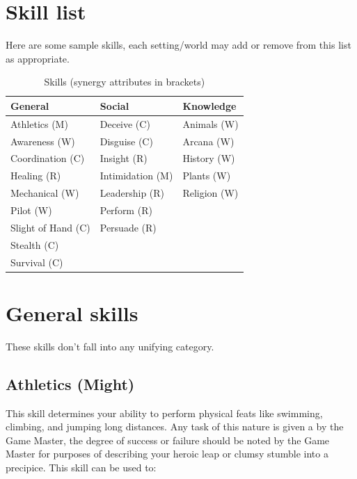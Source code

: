 \documentclass[a4paper,10pt,oneside]{book}
\newcommand{\textlf}[1]{\textbf{\titlecap{#1}}}
\begin{document}
\section{Skill list}
Here are some sample skills, each setting/world may add or remove from this list as appropriate.

\begin{table}[ht!]
	\centering
	\caption{Skills (synergy attributes in brackets)}
	\begin{tabular}{|l|l|l|}
		\hline
		 General & Social & Knowledge\\ [0.5ex]
		\hline
		Athletics (M)  &  Deceive (C)  &  Animals (W) \\
		Awareness (W)  &  Disguise (C)  &  Arcana (W) \\
		Coordination (C) &  Insight (R)  &  History (W) \\
		Healing (R)   &  Intimidation (M)  &  Plants (W) \\
		Mechanical (W) &  Leadership (R)  &  Religion (W) \\
		Pilot (W) &  Perform (R)  &  \\
		Slight of Hand (C)  &  Persuade (R)  &  \\
		Stealth (C) & & \\
		Survival (C)  &  &  \\
		\hline
	\end{tabular}
\end{table}



\section{General skills}
These skills don't fall into any unifying category.

\subsection{Athletics (Might)}
This skill determines your ability to perform physical feats like swimming, climbing, and jumping long distances. Any task of this nature is given a \textlf{difficulty} by the Game Master, the degree of success or failure should be noted by the Game Master for purposes of describing your heroic leap or clumsy stumble into a precipice. This skill can be used to:
\end{document}
